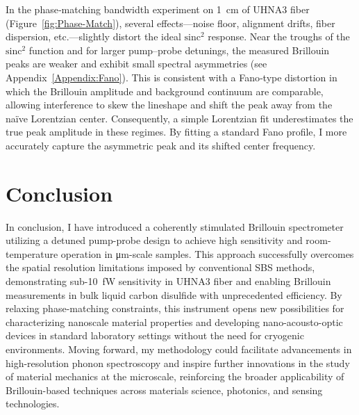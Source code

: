 In the phase‐matching bandwidth experiment on \SI{1}{\centi\meter} of UHNA3 fiber (Figure~\ref{fig:Phase-Match}), several effects—noise floor, alignment drifts, fiber dispersion, etc.—slightly distort the ideal \(\mathrm{sinc^{2}}\) response. Near the troughs of the \(\mathrm{sinc^{2}}\) function and for larger pump–probe detunings, the measured Brillouin peaks are weaker and exhibit small spectral asymmetries (see Appendix~\ref{Appendix:Fano}). This is consistent with a Fano‐type distortion in which the Brillouin amplitude and background continuum are comparable, allowing interference to skew the lineshape and shift the peak away from the naïve Lorentzian center. Consequently, a simple Lorentzian fit underestimates the true peak amplitude in these regimes. By fitting a standard Fano profile, I more accurately capture the asymmetric peak and its shifted center frequency.

\section{Conclusion}
\label{Conclusion}

In conclusion, I have introduced a coherently stimulated Brillouin spectrometer utilizing a detuned pump-probe design to achieve high sensitivity and room-temperature operation in \si{\micro\meter}-scale samples. This approach successfully overcomes the spatial resolution limitations imposed by conventional SBS methods, demonstrating sub-\SI{10}{\femto\watt} sensitivity in UHNA3 fiber and enabling Brillouin measurements in bulk liquid carbon disulfide with unprecedented efficiency. By relaxing phase-matching constraints, this instrument opens new possibilities for characterizing nanoscale material properties and developing nano-acousto-optic devices in standard laboratory settings without the need for cryogenic environments. Moving forward, my methodology could facilitate advancements in high-resolution phonon spectroscopy and inspire further innovations in the study of material mechanics at the microscale, reinforcing the broader applicability of Brillouin-based techniques across materials science, photonics, and sensing technologies.
